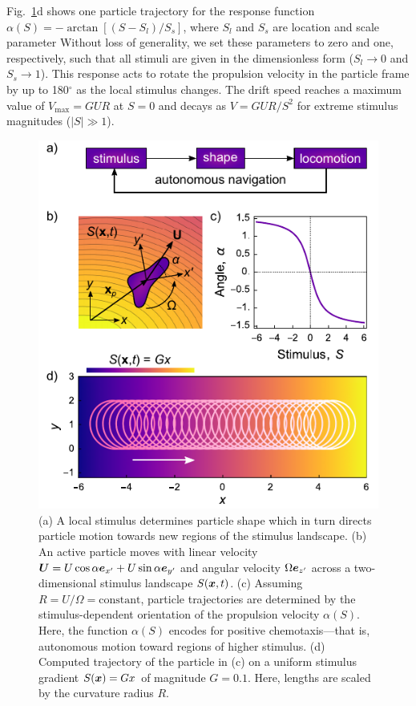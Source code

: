 Fig.\ \ref{fig:4.1}d shows one particle trajectory for the response function $\alpha(S) = -\arctan[(S-S_l)/S_s]$, where $S_l$ and $S_s$ are location and scale parameter   Without loss of generality, we set these parameters to zero and one, respectively, such that all stimuli are given in the dimensionless form ($S_l\rightarrow0$ and $S_s\rightarrow1$).  This response acts to rotate the propulsion velocity in the particle frame by up to 180$^{\circ}$ as the local stimulus changes.  The drift speed reaches a maximum value of $V_{\max}=G U R$ at $S=0$ and decays as $V=G U R / S^2$ for extreme stimulus magnitudes ($\lvert S \rvert \gg 1$).

\begin{figure}[h!]
     \centering
     \includegraphics{figures/4_1.pdf}
     \caption{
     (a) A local stimulus determines particle shape which in turn directs particle motion towards new regions of the stimulus landscape.
     (b) An active particle moves with linear velocity $\boldsymbol{U}= U\cos\alpha \boldsymbol{e}_{x'} + U\sin\alpha \boldsymbol{e}_{y'}$ and angular velocity $\Omega\boldsymbol{e}_{z'}$ across a two-dimensional stimulus landscape $S(\boldsymbol{x},t)$.  
     (c) Assuming $R=U/\Omega=\text{constant}$, particle trajectories are determined by the stimulus-dependent orientation of the propulsion velocity $\alpha(S)$. Here, the function $\alpha(S)$ encodes for positive chemotaxis---that is, autonomous motion toward regions of higher stimulus. 
     (d) Computed trajectory of the particle in (c) on a uniform stimulus gradient $S(\boldsymbol{x})=G x$ of magnitude $G=0.1$. Here, lengths are scaled by the curvature radius $R$.}
     \label{fig:4.1}
 \end{figure}


